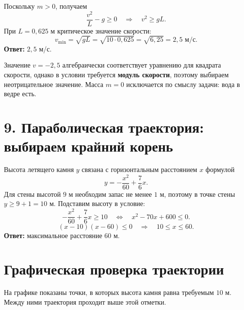\documentclass[a4paper,11pt]{article}
\newcommand{\key}[1]{\textcolor{darkaccent}{\textbf{#1}}}
\begin{document}
Поскольку \(m>0\), получаем
\[
\frac{v^2}{L}-g\ge0
\quad\Longrightarrow\quad v^2\ge gL.
\]
При \(L=0{,}625\) м критическое значение скорости:
\[
v_{\min}=\sqrt{gL}=\sqrt{10\cdot0{,}625}
=\sqrt{6{,}25}=2{,}5\text{ м/с}.
\]
\key{Ответ:} \(2{,}5\) м/с.

Значение \(v=-2{,}5\) алгебраически соответствует уравнению
для квадрата скорости, однако в условии требуется \textbf{модуль скорости},
поэтому выбираем неотрицательное значение. Масса \(m=0\) исключается
по смыслу задачи: вода в ведре есть.

\section*{9. Параболическая траектория: выбираем крайний корень}

Высота летящего камня \(y\) связана с горизонтальным расстоянием \(x\)
формулой
\[
y=-\frac{x^2}{60}+\frac76x.
\]
Для стены высотой \(9\) м необходим запас не менее \(1\) м,
поэтому в точке стены \(y\ge9+1=10\text{ м}\).
Подставим высоту в условие:
\[
-\frac{x^2}{60}+\frac76x\ge10
\quad\Longleftrightarrow\quad
x^2-70x+600\le0.
\]
\[
(x-10)(x-60)\le0
\quad\Longrightarrow\quad 10\le x\le60.
\]
\key{Ответ:} максимальное расстояние \(60\) м.

\clearpage
\section*{Графическая проверка траектории}
На графике показаны точки, в которых высота камня равна требуемым
\(10\) м. Между ними траектория проходит выше этой отметки.

\begin{center}
\end{center}
\end{document}
